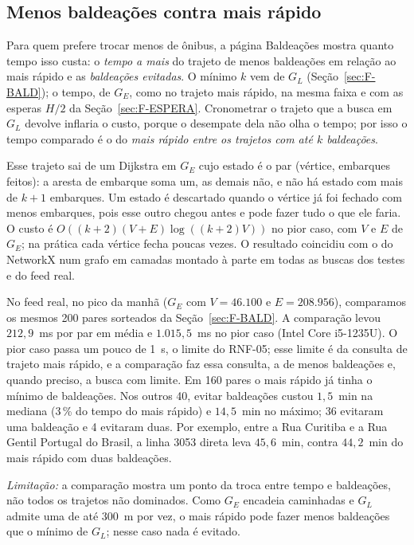 \subsection{Menos baldeações contra mais rápido}\label{sec:F-BALD-2}

Para quem prefere trocar menos de ônibus, a página Baldeações mostra quanto tempo isso
custa: o \emph{tempo a mais} do trajeto de menos baldeações em relação ao mais rápido e as
\emph{baldeações evitadas}. O mínimo $k$ vem de $G_L$ (Seção~\ref{sec:F-BALD}); o tempo, de
$G_E$, como no trajeto mais rápido, na mesma faixa e com as esperas $H/2$ da
Seção~\ref{sec:F-ESPERA}. Cronometrar o trajeto que a busca em $G_L$ devolve inflaria o
custo, porque o desempate dela não olha o tempo; por isso o tempo comparado é o do
\emph{mais rápido entre os trajetos com até $k$ baldeações}.

Esse trajeto sai de um Dijkstra em $G_E$ cujo estado é o par (vértice, embarques feitos):
a aresta de embarque soma um, as demais não, e não há estado com mais de $k + 1$ embarques.
Um estado é descartado quando o vértice já foi fechado com menos embarques, pois esse outro
chegou antes e pode fazer tudo o que ele faria. O custo é
$O((k + 2)(V + E)\log((k + 2)V))$ no pior caso, com $V$ e $E$ de $G_E$; na prática cada
vértice fecha poucas vezes. O resultado coincidiu com o do NetworkX num grafo em camadas
montado à parte em todas as buscas dos testes e do feed real.

No feed real, no pico da manhã ($G_E$ com $V = 46.100$ e $E = 208.956$), comparamos os
mesmos 200 pares sorteados da Seção~\ref{sec:F-BALD}. A comparação levou $212{,}9$~ms por
par em média e $1.015{,}5$~ms no pior caso (Intel Core i5-1235U). O pior caso passa um pouco
de 1~s, o limite do RNF-05; esse limite é da consulta de trajeto mais rápido, e a comparação
faz essa consulta, a de menos baldeações e, quando preciso, a busca com limite. Em 160 pares o mais rápido
já tinha o mínimo de baldeações. Nos outros 40, evitar baldeações custou $1{,}5$~min na
mediana (3\,\% do tempo do mais rápido) e $14{,}5$~min no máximo; 36 evitaram uma
baldeação e 4 evitaram duas. Por exemplo, entre a Rua Curitiba e a Rua Gentil Portugal do
Brasil, a linha 3053 direta leva $45{,}6$~min, contra $44{,}2$~min do mais rápido com duas
baldeações.

\emph{Limitação:} a comparação mostra um ponto da troca entre tempo e baldeações, não todos
os trajetos não dominados. Como $G_E$ encadeia caminhadas e $G_L$ admite uma de até 300~m
por vez, o mais rápido pode fazer menos baldeações que o mínimo de $G_L$; nesse caso nada é
evitado.
